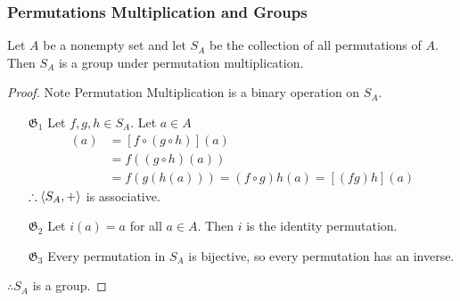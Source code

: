 \subsubsection{Permutations Multiplication and Groups}
Let $A$ be a nonempty set and let $S_A$ be the collection of all permutations of $A$. Then $S_A$ is a group under permutation multiplication.
\begin{proof}
    Note Permutation Multiplication is a binary operation on $S_A$.
    \begin{itemize}
        \item[$\mathfrak{G}_1$] Let $f,g,h \in S_A$. Let $a \in A$
        \begin{align*}
            [f(gh)](a) & = [f \circ (g \circ h)](a) \\
            & = f((g\circ h)(a)) \\
            & = f(g(h(a))) = (f\circ g)h(a) = [(fg)h](a)
        \end{align*}
        $\therefore \langle S_A, + \rangle$ is associative.
        \item[$\mathfrak{G}_2$] Let $i(a) = a$ for all $a \in A$. Then $i$ is the identity permutation.
        \item[$\mathfrak{G}_3$] Every permutation in $S_A$ is bijective, so every permutation has an inverse.
    \end{itemize}
    $\therefore S_A$ is a group.
\end{proof}